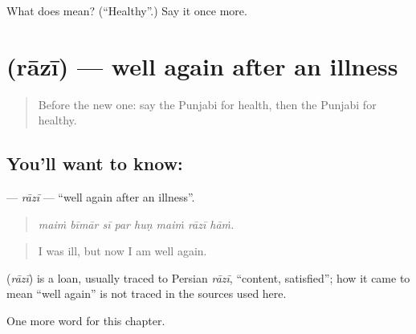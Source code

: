 \begin{tcolorbox}[breakable,colback=teal!4,colframe=teal!35!black,title={Before you move on}]
What does  mean? (\textquotedblleft{}Healthy\textquotedblright{}.) Say it once more.
\end{tcolorbox}
\section[\texorpdfstring{\pa{ਰਾਜ਼ੀ} (rāzī)}{ਰਾਜ਼ੀ (rāzī)}]{ (rāzī) — well again after an illness}

\label{lesson:PA-C319-razi}



\begin{quote}
Before the new one: say the Punjabi for health, then the Punjabi for healthy.
\end{quote}

\subsection*{You'll want to know: }
\textbf{} — \emph{rāzī} — \textquotedblleft{}well again after an illness\textquotedblright{}.

\begin{quote}
       
\end{quote}

\begin{quote}
\emph{maiṁ bīmār sī par huṇ maiṁ rāzī hāṁ.}
\end{quote}

\begin{quote}
I was ill, but now I am well again.
\end{quote}

\begin{cousinweb}
\textbf{} (\emph{rāzī}) is a loan, usually traced to Persian \emph{rāzī}, \textquotedblleft{}content, satisfied\textquotedblright{}; how it came to mean \textquotedblleft{}well again\textquotedblright{} is not traced in the sources used here.
\end{cousinweb}

\begin{grammarlens}[title={What you've built}]
One more word for this chapter.
\end{grammarlens}


